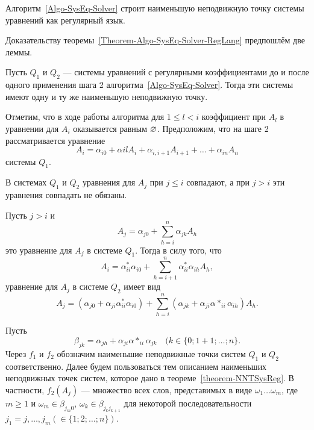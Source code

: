 \begin{mytheorem}
\label{Theorem-Algo-SysEq-Solver-RegLang}
Алгоритм~\ref{Algo-SysEq-Solver} строит наименьшую неподвижную точку системы уравнений как регулярный язык.
\end{mytheorem}

Доказательству теоремы~\ref{Theorem-Algo-SysEq-Solver-RegLang} предпошлём две леммы.

\begin{mylemma}
\label{RegSysSolver-lemma1}
Пусть $Q_1$ и $Q_2$ --- системы уравнений с регулярными коэффициентами до и после одного применения шага 2 алгоритма~\ref{Algo-SysEq-Solver}. Тогда эти системы имеют одну и ту же наименьшую неподвижную точку.
\end{mylemma}

\begin{myproof}
Отметим, что в ходе работы алгоритма для $1\le l<i$ коэффициент при $A_l$ в уравнении для $A_i$ оказывается равным $\varnothing$. Предположим, что на шаге 2 рассматривается уравнение
\[
A_i = \alpha_{i0} + \alpha{il}A_i + \alpha_{i,i+1}A_{i+1} + \ldots + \alpha_{in}A_n
\]
системы $Q_1$.

В системах $Q_1$ и $Q_2$ уравнения для $A_j$ при $j\le i$ совпадают, а при $j>i$ эти уравнения совпадать не обязаны.

Пусть $j>i$ и
\begin{equation}
\label{eq231}
A_j = \alpha_{j0} + \underset{h=i}{\overset{n}{\sum}} \alpha_{jk}A_h	%
\end{equation}
это уравнение для $A_j$ в системе $Q_1$. Тогда в силу того, что
\begin{equation*}
	A_i = \alpha^*_{ii}\alpha_{i0} + \underset{h=i+1}{\overset{n}{\sum}} \alpha^*_{ii}\alpha_{ih}A_h,
\end{equation*}
уравнение для $A_j$ в системе $Q_2$ имеет вид
\begin{equation}
\label{eq232}
A_j = (\alpha_{j0}+\alpha_{ji}\alpha^*_{ii}\alpha_{i0}) + \underset{h=i}{\overset{n}{\sum}} (\alpha_{jk}+\alpha_{ji}\alpha*_{ii}\alpha_{ih})A_h.
\end{equation}

Пусть
\begin{equation*}	\beta_{jk}=\alpha_{jh}+\alpha_{ji}\alpha*_{ii}\alpha_{jk} \quad	(k\in\{0;1+1;\ldots ;n\}.
\end{equation*}
Через $f_1$ и $f_2$ обозначим наименьшие неподвижные точки систем $Q_1$ и $Q_2$ соответственно. Далее будем пользоваться тем описанием наименьших неподвижных точек систем, которое дано в теореме~\ref{theorem-NNTSysReg}. В частности, $f_2(A_j)$ --- множество всех слов, представимых в виде $\omega_1\ldots\omega_m$, где $m\ge 1$ и $\omega_m\in\beta_{j_m0}$, $\omega_k\in\beta_{j_{k}j_{k+1}}$ для некоторой последовательности $j_1=j, \dots , j_{m} (\in\{1;2;\ldots ;n\})$.


\end{myproof}
